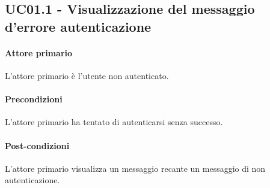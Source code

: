\subsection{UC01.1 - Visualizzazione del messaggio d'errore autenticazione}\label{uc:01.1}

\paragraph{Attore primario} L'attore primario è l'utente non autenticato.

\paragraph{Precondizioni} L'attore primario ha tentato di autenticarsi senza successo.

\paragraph{Post-condizioni} L'attore primario visualizza un messaggio recante un messaggio di non autenticazione.